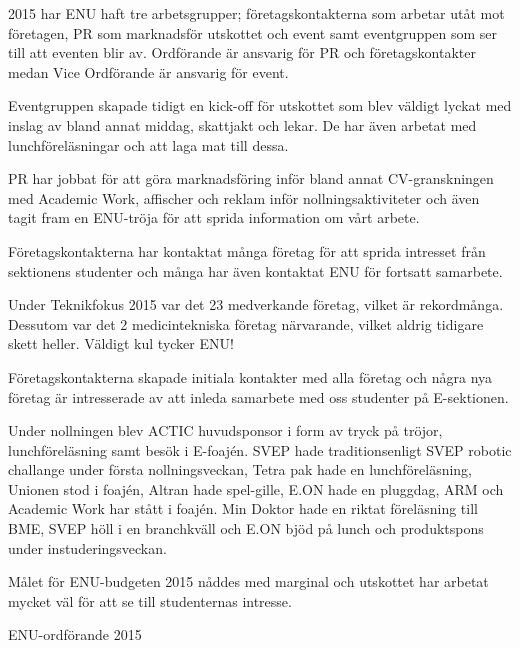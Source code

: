 \documentclass[../_main/handlingar.tex]{subfiles}
\begin{document}

2015 har ENU haft tre arbetsgrupper; företagskontakterna som arbetar utåt mot företagen, PR som marknadsför utskottet och event samt eventgruppen som ser till att eventen blir av. Ordförande är ansvarig för PR och företagskontakter medan Vice Ordförande är ansvarig för event.

Eventgruppen skapade tidigt en kick-off för utskottet som blev väldigt lyckat med inslag av bland annat middag, skattjakt och lekar. De har även arbetat med lunchföreläsningar och att laga mat till dessa.

PR har jobbat för att göra marknadsföring inför bland annat CV-granskningen med Academic Work, affischer och reklam inför nollningsaktiviteter och även tagit fram en ENU-tröja för att sprida information om vårt arbete.

Företagskontakterna har kontaktat många företag för att sprida intresset från sektionens studenter och många har även kontaktat ENU för fortsatt samarbete.

Under Teknikfokus 2015 var det 23 medverkande företag, vilket är rekordmånga. Dessutom var det 2 medicintekniska företag närvarande, vilket aldrig tidigare skett heller. Väldigt kul tycker ENU!

Företagskontakterna skapade initiala kontakter med alla företag och några nya företag är intresserade av att inleda samarbete med oss studenter på E-sektionen.

Under nollningen blev ACTIC huvudsponsor i form av tryck på tröjor, lunchföreläsning samt besök i E-foajén. SVEP hade traditionsenligt SVEP robotic challange under första nollningsveckan, Tetra pak hade en lunchföreläsning, Unionen stod i foajén, Altran hade spel-gille, E.ON hade en pluggdag, ARM och Academic Work har stått i foajén. Min Doktor hade en riktat föreläsning till BME, SVEP höll i en branchkväll och E.ON bjöd på lunch och produktspons under instuderingsveckan.

Målet för ENU-budgeten 2015 nåddes med marginal och utskottet har arbetat mycket väl för att se till studenternas intresse.

\begin{signatures}{1}
    \mvh
    \signature{Lovisa Lundin}{ENU-ordförande 2015}
\end{signatures}
\end{document}
